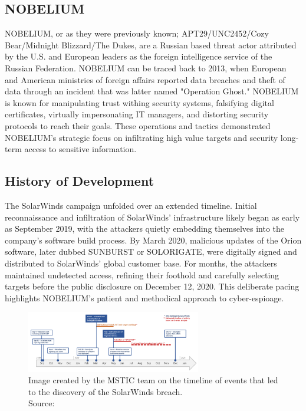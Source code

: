 \documentclass[conference]{IEEEtran}
\begin{document}
\subsection{NOBELIUM}
NOBELIUM, or as they were previously known; APT29/UNC2452/Cozy Bear/Midnight Blizzard/The Dukes,
are a Russian based threat actor attributed by the U.S. and European leaders as the foreign
intelligence service of the Russian Federation\cite{Microdoft2024NOBELIUM}. NOBELIUM can be traced back
to 2013, when European and American ministries of foreign affairs reported data breaches and theft of data 
through an incident that was latter named "Operation Ghost."\cite{MITREFirstNOBELIUMAttack} NOBELIUM is known for manipulating trust
withing security systems, falsifying digital certificates, virtually impersonating IT managers, and distorting security protocols
to reach their goals. These operations and tactics demonstrated NOBELIUM's strategic focus on infiltrating
high value targets and security long-term access to sensitive information.\\
\subsection{History of Development}
The SolarWinds campaign unfolded over an extended timeline. Initial reconnaissance and infiltration of SolarWinds'
infrastructure likely began as early as September 2019\cite{MicrosoftDeepDiveSOLORIGATE}, with the attackers
quietly embedding themselves into the company's software build process. By March 2020, malicious updates of the Orion
software, later dubbed SUNBURST or SOLORIGATE, were digitally signed and distributed to SolarWinds' global customer base.
For months, the attackers maintained undetected access, refining their foothold and carefully selecting targets before the 
public disclosure on December 12, 2020. This deliberate pacing highlights NOBELIUM's patient and methodical approach to 
cyber-espioage.
\begin{figure}[H]
    \centering
    \includegraphics[width=3in]{Timeline-of-Solorigate-attacks.png}
    \caption{Image created by the MSTIC team on the timeline of events that led to the discovery of the SolarWinds
    breach.\\Source: \cite{MicrosoftDeepDiveSOLORIGATE} }
    \label{fig:Timeline-of-Solorigate-attacks}
\end{figure}
\end{document}
